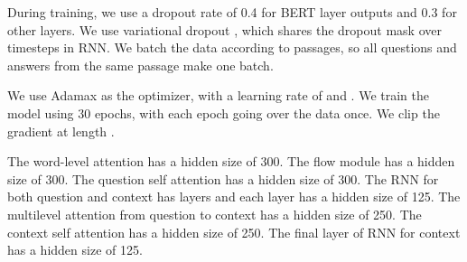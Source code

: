 \documentclass{article} \usepackage{sdnet,times}
\begin{document}
During training, we use a dropout rate of 0.4 for BERT layer outputs and 0.3 for other layers. We use variational dropout \citep{vd}, which shares the dropout mask over timesteps in RNN. We batch the data according to passages, so all questions and answers from the same passage make one batch. 

We use Adamax \citep{adamax} as the optimizer, with a learning rate of  and . We train the model using 30 epochs, with each epoch going over the data once. We clip the gradient at length .

The word-level attention has a hidden size of 300. The flow module has a hidden size of 300. The question self attention has a hidden size of 300. The RNN for both question and context has  layers and each layer has a hidden size of 125. The multilevel attention from question to context has a hidden size of 250. The context self attention has a hidden size of 250. The final layer of RNN for context has a hidden size of 125.
\end{document}
